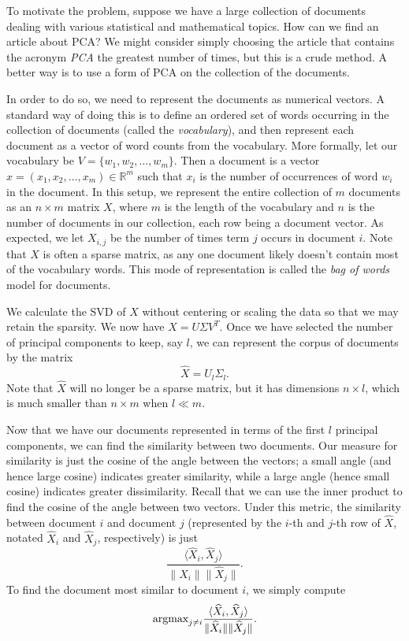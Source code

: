 To motivate the problem, suppose we have a large collection of documents dealing with various statistical and mathematical topics.
How can we find an article about PCA?
We might consider simply choosing the article that contains the acronym \emph{PCA} the greatest number of times, but this is a crude method.
A better way is to use a form of PCA on the collection of the documents.

In order to do so, we need to represent the documents as numerical vectors.
A standard way of doing this is to define an ordered set of words occurring in the collection of documents (called the \emph{vocabulary}), and then
represent each document as a vector of word counts from the vocabulary.
More formally, let our vocabulary be $V = \{w_1,w_2,\ldots,w_m\}$.
Then a document is a vector $x  = (x_1,x_2,\ldots,x_m) \in \mathbb{R}^m$ such that $x_i$ is the number of occurrences of word $w_i$ in the document.
In this setup, we represent the entire collection of $m$ documents as an $n \times m$ matrix $X$, where $m$ is the length of the vocabulary and $n$ is the number of documents in our collection, each row being a document vector.
As expected, we let $X_{i,j}$ be the number of times term $j$ occurs in document $i$.
Note that $X$ is often a sparse matrix, as any one document likely doesn't contain most of the vocabulary words.
This mode of representation is called the \emph{bag of words} model for documents.

We calculate the SVD of $X$ without centering or scaling the data so that we may retain the sparsity.
We now have $X = U\Sigma V^T$. Once we have selected the number of principal components to keep, say $l$, we can represent the corpus of documents by the matrix
\[
\widehat{X} = U_l\Sigma_l.
\]
Note that $\widehat{X}$ will no longer be a sparse matrix, but it has dimensions $n \times l$, which is much smaller than $n \times m$ when $l \ll m$.

Now that we have our documents represented in terms of the first $l$ principal components, we can find the similarity between two documents.
Our measure for similarity is just the cosine of the angle between the vectors; a small angle (and hence large cosine) indicates greater similarity, while a large angle (hence small cosine)
indicates greater dissimilarity.
Recall that we can use the inner product to find the cosine of the angle between two vectors.
Under this metric, the similarity between document $i$ and document $j$ (represented by the $i$-th and $j$-th row of $\widehat{X}$, notated $\widehat{X}_i$ and $\widehat{X}_j$, respectively) is just
\[
\frac{\langle \widehat{X}_i, \widehat{X}_j\rangle}{\|\widehat{X}_i\|\|\widehat{X}_j\|}.
\]
To find the document most similar to document $i$, we simply compute
\[
\mbox{argmax}_{j\neq i} \frac{\langle \widehat{X}_i, \widehat{X}_j\rangle}{\|\widehat{X}_i\|\|\widehat{X}_j\|}.
\]


